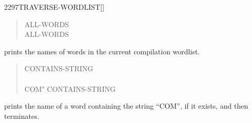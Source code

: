 \begin{worddef}{2297}{TRAVERSE-WORDLIST}[]
\begin{rationale}
		\begin{quote}\ttfamily
			\word{:} ALL-WORDS
				   
			\word{;}
		\\
			 ALL-WORDS 
		\end{quote}
 
		prints the names of words in the current compilation wordlist.

		\begin{quote}\ttfamily
			\word{:} CONTAINS-STRING \\
\tab 			{} 
				 
					 
				  \word{;} \\
		 COM"  CONTAINS-STRING
		 
		\end{quote}
 
		prints the name of a word containing the string
		``COM'', if it exists, and then terminates.
	\end{rationale}
\end{worddef}

